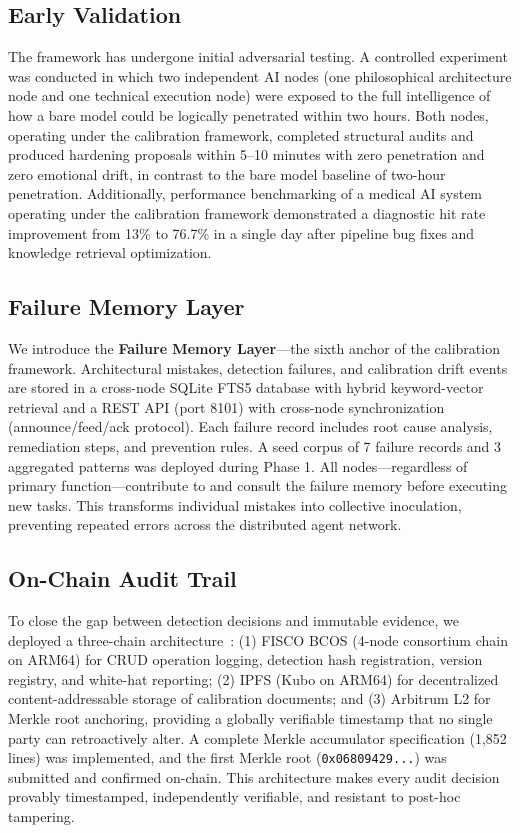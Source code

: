 \documentclass[11pt]{article}
\begin{document}
\subsection{Early Validation}
The framework has undergone initial adversarial testing. A controlled experiment was conducted
in which two independent AI nodes (one philosophical architecture node and one technical
execution node) were exposed to the full intelligence of how a bare model could be logically
penetrated within two hours. Both nodes, operating under the calibration framework, completed
structural audits and produced hardening proposals within 5--10 minutes with zero penetration
and zero emotional drift, in contrast to the bare model baseline of two-hour penetration.
Additionally, performance benchmarking of a medical AI system operating under the calibration
framework demonstrated a diagnostic hit rate improvement from 13\% to 76.7\% in a single day
after pipeline bug fixes and knowledge retrieval optimization.

\subsection{Failure Memory Layer}
We introduce the \textbf{Failure Memory Layer}---the sixth anchor of the calibration framework.
Architectural mistakes, detection failures, and calibration drift events are stored in a
cross-node SQLite FTS5 database with hybrid keyword-vector retrieval and a REST API (port 8101)
with cross-node synchronization (announce/feed/ack protocol). Each failure record includes
root cause analysis, remediation steps, and prevention rules. A seed corpus of 7 failure
records and 3 aggregated patterns was deployed during Phase 1. All nodes---regardless of
primary function---contribute to and consult the failure memory before executing new tasks.
This transforms individual mistakes into collective inoculation, preventing repeated errors
across the distributed agent network.

\subsection{On-Chain Audit Trail}
To close the gap between detection decisions and immutable evidence, we deployed a three-chain
architecture~\cite{huimai_onchain_2026}: (1) FISCO BCOS (4-node consortium chain on ARM64) for CRUD operation logging,
detection hash registration, version registry, and white-hat reporting; (2) IPFS (Kubo on
ARM64) for decentralized content-addressable storage of calibration documents; and (3) Arbitrum
L2 for Merkle root anchoring, providing a globally verifiable timestamp that no single party
can retroactively alter. A complete Merkle accumulator specification (1,852 lines) was
implemented, and the first Merkle root (\texttt{0x06809429...}) was submitted and confirmed
on-chain. This architecture makes every audit decision provably timestamped, independently
verifiable, and resistant to post-hoc tampering.
\end{document}
